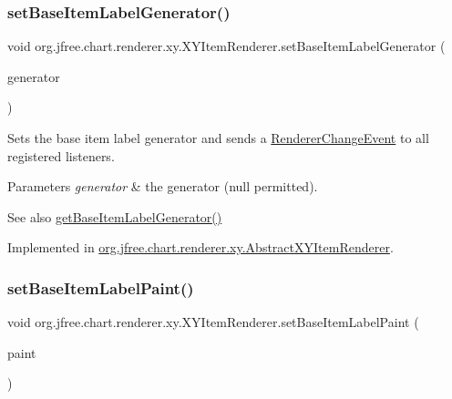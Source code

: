 \subsubsection{\texorpdfstring{set\+Base\+Item\+Label\+Generator()}{setBaseItemLabelGenerator()}}
{\footnotesize\ttfamily void org.\+jfree.\+chart.\+renderer.\+xy.\+X\+Y\+Item\+Renderer.\+set\+Base\+Item\+Label\+Generator (\begin{DoxyParamCaption}\item[{\mbox{\hyperlink{interfaceorg_1_1jfree_1_1chart_1_1labels_1_1_x_y_item_label_generator}{X\+Y\+Item\+Label\+Generator}}}]{generator }\end{DoxyParamCaption})}

Sets the base item label generator and sends a \mbox{\hyperlink{}{Renderer\+Change\+Event}} to all registered listeners.


\begin{DoxyParams}{Parameters}
{\em generator} & the generator ({\ttfamily null} permitted).\\
\hline
\end{DoxyParams}
\begin{DoxySeeAlso}{See also}
\mbox{\hyperlink{interfaceorg_1_1jfree_1_1chart_1_1renderer_1_1xy_1_1_x_y_item_renderer_a8f57b67c1de4f5a63fc6f55dba4be0f6}{get\+Base\+Item\+Label\+Generator()}} 
\end{DoxySeeAlso}


Implemented in \mbox{\hyperlink{classorg_1_1jfree_1_1chart_1_1renderer_1_1xy_1_1_abstract_x_y_item_renderer_a579128c27e51f1fa12ed95798abfa222}{org.\+jfree.\+chart.\+renderer.\+xy.\+Abstract\+X\+Y\+Item\+Renderer}}.

\mbox{\label{interfaceorg_1_1jfree_1_1chart_1_1renderer_1_1xy_1_1_x_y_item_renderer_aa1ba3f77c7f073a7214dc7ff3e42536e}} 
\subsubsection{\texorpdfstring{set\+Base\+Item\+Label\+Paint()}{setBaseItemLabelPaint()}}
{\footnotesize\ttfamily void org.\+jfree.\+chart.\+renderer.\+xy.\+X\+Y\+Item\+Renderer.\+set\+Base\+Item\+Label\+Paint (\begin{DoxyParamCaption}\item[{Paint}]{paint }\end{DoxyParamCaption})}

